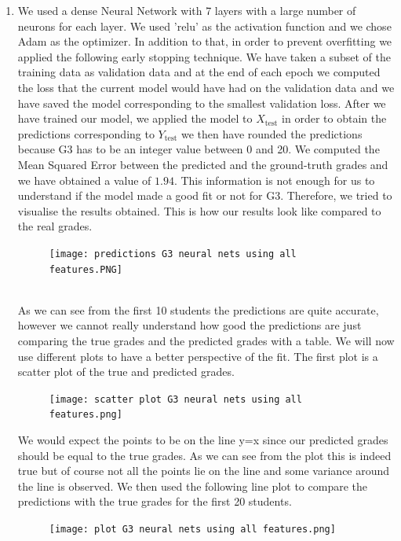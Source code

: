 \documentclass[a4paper, 11pt]{article}
\theoremstyle{definition}
\numberwithin{equation}{section}		%
\numberwithin{table}{section}				%
\begin{document}
\begin{enumerate}
    \item We used a dense Neural Network with 7 layers with a large number of neurons for each layer. We used 'relu' as the activation function and we chose Adam as the optimizer. In addition to that, in order to prevent overfitting we applied the following early stopping technique. We have taken a subset of the training data as validation data and at the end of each epoch we computed the loss that the current model would have had on the validation data and we have saved the model corresponding to the smallest validation loss. After we have trained our model, we applied the model to $X_{\text{test}}$ in order to obtain the predictions corresponding to $Y_{\text{test}}$ we then have rounded the predictions because G3 has to be an integer value between 0 and 20. We computed the Mean Squared Error between the predicted and the ground-truth grades and we have obtained a value of $1.94$. This information is not enough for us to understand if the model made a good fit or not for G3. Therefore, we tried to visualise the results obtained.
    This is how our results look like compared to the real grades.
    \begin{figure}[h]\centering
\texttt{[image: predictions G3 neural nets using all features.PNG]}
\end{figure}\\
As we can see from the first 10 students the predictions are quite accurate, however we cannot really understand how good the predictions are just comparing the true grades and the predicted grades with a table. We will now use different plots to have a better perspective of the fit. \newpage
The first plot is a scatter plot of the true and predicted grades.\\
\begin{figure}[H]
\centering
\texttt{[image: scatter plot G3 neural nets using all features.png]}
\end{figure}
We would expect the points to be on the line y=x since our predicted grades should be equal to the true grades. As we can see from the plot this is indeed true but of course not all the points lie on the line and some variance around the line is observed. We then used the following line plot to compare the predictions with the true grades for the first 20 students.
\begin{figure}[H]\centering
\texttt{[image: plot G3 neural nets using all features.png]}
\end{figure}
\newpage

\end{enumerate}
\end{document}
